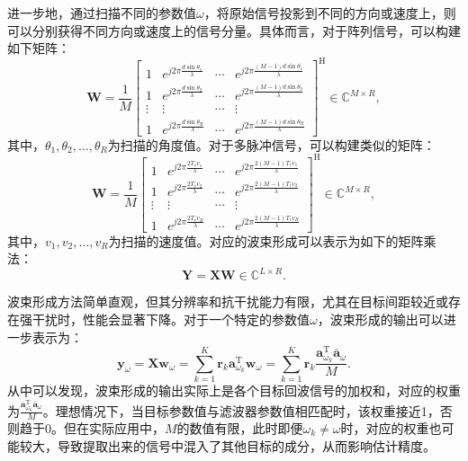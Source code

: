 进一步地，通过扫描不同的参数值\( \omega \)，将原始信号投影到不同的方向或速度上，则可以分别获得不同方向或速度上的信号分量。具体而言，对于阵列信号，可以构建如下矩阵：
\[
    \mathbf{W} = \frac{1}{M}\begin{bmatrix}
        1      & e^{j 2 \pi \frac{d \sin \theta_1}{\lambda}} & \cdots & e^{j 2 \pi \frac{(M-1)d \sin \theta_1 }{\lambda}} \\
        1      & e^{j 2 \pi \frac{d \sin \theta_2}{\lambda}} & \cdots & e^{j 2 \pi \frac{(M-1)d \sin \theta_2 }{\lambda}} \\
        \vdots & \vdots                                      & \cdots & \vdots                                            \\
        1      & e^{j 2 \pi \frac{d \sin \theta_R}{\lambda}} & \cdots & e^{j 2 \pi \frac{(M-1)d \sin \theta_R }{\lambda}}
    \end{bmatrix}^{\mathrm{H}} \in \mathbb{C}^{M \times R},
\]
其中，\( \theta_1, \theta_2, \ldots, \theta_R \)为扫描的角度值。对于多脉冲信号，可以构建类似的矩阵：
\[
    \mathbf{W} = \frac{1}{M}\begin{bmatrix}
        1      & e^{j 2 \pi \frac{2 T_r v_1}{\lambda}} & \cdots & e^{j 2 \pi \frac{2 (M-1) T_r v_1 }{\lambda}} \\
        1      & e^{j 2 \pi \frac{2 T_r v_2}{\lambda}} & \cdots & e^{j 2 \pi \frac{2 (M-1) T_r v_2 }{\lambda}} \\
        \vdots & \vdots                                & \cdots & \vdots                                       \\
        1      & e^{j 2 \pi \frac{2 T_r v_R}{\lambda}} & \cdots & e^{j 2 \pi \frac{2 (M-1) T_r v_R }{\lambda}}
    \end{bmatrix}^{\mathrm{H}} \in \mathbb{C}^{M \times R},
\]
其中，\( v_1, v_2, \ldots, v_R \)为扫描的速度值。对应的波束形成可以表示为如下的矩阵乘法：
\[
    \mathbf{Y} = \mathbf{X} \mathbf{W} \in \mathbb{C}^{L \times R}.
\]

波束形成方法简单直观，但其分辨率和抗干扰能力有限，尤其在目标间距较近或存在强干扰时，性能会显著下降。对于一个特定的参数值\( \omega \)，波束形成的输出可以进一步表示为：
\[
    \bm{y}_{\omega} = \mathbf{X} \bm{w}_{\omega} = \sum_{k=1}^{K} \bm{r}_k \bm{a}_{\omega_k}^{\mathrm{T}} \bm{w}_{\omega} = \sum_{k=1}^{K} \bm{r}_k \frac{\bm{a}_{\omega_k}^{\mathrm{T}} \overline{\bm{a}}_{\omega}}{M}.
\]
从中可以发现，波束形成的输出实际上是各个目标回波信号的加权和，对应的权重为\( \frac{\bm{a}_{\omega_k}^{\mathrm{T}} \overline{\bm{a}}_{\omega}}{M} \)。理想情况下，当目标参数值与滤波器参数值相匹配时，该权重接近1，否则趋于0。但在实际应用中，\( M \)的数值有限，此时即便\( \omega_k \neq \omega \)时，对应的权重也可能较大，导致提取出来的信号中混入了其他目标的成分，从而影响估计精度。

